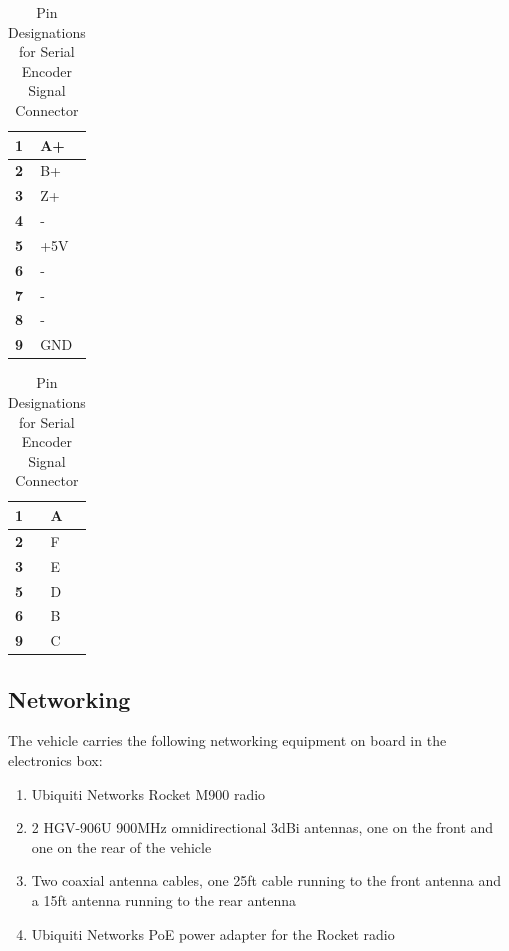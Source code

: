 \begin{table}[H]
\centering
\caption{Pin Designations for Serial Encoder Signal Connector}
\label{pintable}
\begin{tabular}{|l|l|}
\hline
\textbf{1} & A+  \\ \hline
\textbf{2} & B+  \\ \hline
\textbf{3} & Z+ \\ \hline
\textbf{4} & - \\ \hline
\textbf{5} & +5V  \\ \hline
\textbf{6} & -  \\ \hline
\textbf{7} & -  \\ \hline
\textbf{8} & -  \\ \hline
\textbf{9} & GND  \\ \hline
\end{tabular}
\end{table}

\newpage

\begin{table}[H]
\centering
\caption{Pin Designations for Serial Encoder Signal Connector}
\label{pintable}
\begin{tabular}{|l|l|}
\hline
\textbf{1} & A  \\ \hline
\textbf{2} & F  \\ \hline
\textbf{3} & E \\ \hline
\textbf{5} & D\\ \hline
\textbf{6} & B \\ \hline
\textbf{9} & C \\ \hline
\end{tabular}
\end{table}

\subsection{Networking}
\noindent The vehicle carries the following networking equipment on board in the electronics box:\\
\begin{enumerate}
\item Ubiquiti Networks Rocket M900 radio
\item 2 HGV-906U 900MHz omnidirectional 3dBi antennas, one on the front and one on the rear of the vehicle
\item Two coaxial antenna cables, one 25ft cable running to the front antenna and a 15ft antenna running to the rear antenna
\item Ubiquiti Networks PoE power adapter for the Rocket radio
\end{enumerate}

